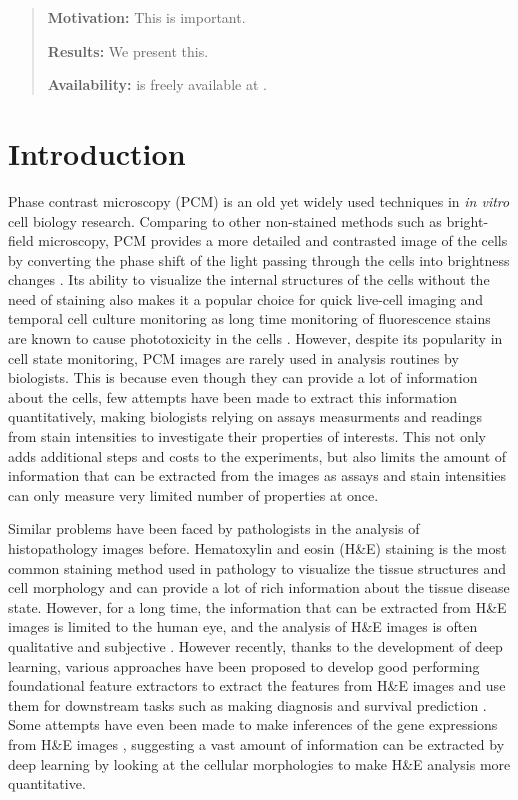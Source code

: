 \begin{refsegment}

\begin{abstract}
  \noindent \textbf{Motivation:} This is important.

  \noindent \textbf{Results:} We present this.

  \noindent \textbf{Availability:}  is freely available at \url{}.
\end{abstract}

\section*{Introduction}

Phase contrast microscopy (PCM) is an old yet widely used techniques in \textit{in vitro} cell biology research. Comparing to other non-stained methods such as bright-field microscopy, PCM provides a more detailed and contrasted image of the cells by converting the phase shift of the light passing through the cells into brightness changes \autocite{pcm_background}. Its ability to visualize the internal structures of the cells without the need of staining also makes it a popular choice for quick live-cell imaging and temporal cell culture monitoring as long time monitoring of fluorescence stains are known to cause phototoxicity in the cells \autocite{phototoxicity}. However, despite its popularity in cell state monitoring, PCM images are rarely used in analysis routines by biologists. This is because even though they can provide a lot of information about the cells, few attempts have been made to extract this information quantitatively, making biologists relying on assays measurments and readings from stain intensities to investigate their properties of interests. This not only adds additional steps and costs to the experiments, but also limits the amount of information that can be extracted from the images as assays and stain intensities can only measure very limited number of properties at once.

Similar problems have been faced by pathologists in the analysis of histopathology images before. Hematoxylin and eosin (H\&E) staining is the most common staining method used in pathology to visualize the tissue structures and cell morphology and can provide a lot of rich information about the tissue disease state. However, for a long time, the information that can be extracted from H\&E images is limited to the human eye, and the analysis of H\&E images is often qualitative and subjective \autocite{he_stain}. However recently, thanks to the development of deep learning, various approaches have been proposed to develop good performing foundational feature extractors \autocite{hoptimus0,phikonv2} to extract the features from H\&E images and use them for downstream tasks such as making diagnosis and survival prediction \autocite{survival_he_1,he_pdl1,he_disease_outcome}. Some attempts have even been made to make inferences of the gene expressions from H\&E images \autocite{bleep,hest-1k}, suggesting a vast amount of information can be extracted by deep learning by looking at the cellular morphologies to make H\&E analysis more quantitative. 


\end{refsegment}
